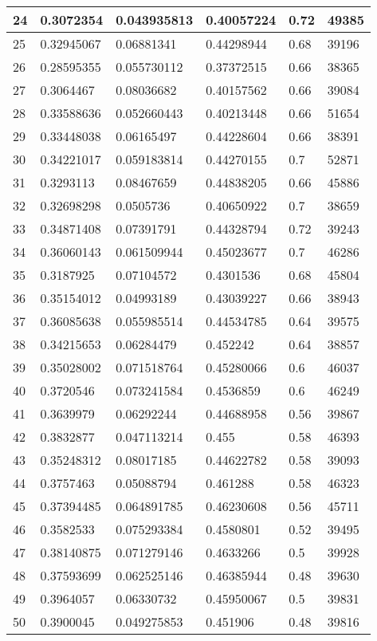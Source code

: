 \begin{longtable}{|l|l|l|l|l|l|}
24 & 0.3072354 & 0.043935813 & 0.40057224 & 0.72 & 49385 \\ \hline 
25 & 0.32945067 & 0.06881341 & 0.44298944 & 0.68 & 39196 \\ \hline 
26 & 0.28595355 & 0.055730112 & 0.37372515 & 0.66 & 38365 \\ \hline 
27 & 0.3064467 & 0.08036682 & 0.40157562 & 0.66 & 39084 \\ \hline 
28 & 0.33588636 & 0.052660443 & 0.40213448 & 0.66 & 51654 \\ \hline 
29 & 0.33448038 & 0.06165497 & 0.44228604 & 0.66 & 38391 \\ \hline 
30 & 0.34221017 & 0.059183814 & 0.44270155 & 0.7 & 52871 \\ \hline 
31 & 0.3293113 & 0.08467659 & 0.44838205 & 0.66 & 45886 \\ \hline 
32 & 0.32698298 & 0.0505736 & 0.40650922 & 0.7 & 38659 \\ \hline 
33 & 0.34871408 & 0.07391791 & 0.44328794 & 0.72 & 39243 \\ \hline 
34 & 0.36060143 & 0.061509944 & 0.45023677 & 0.7 & 46286 \\ \hline 
35 & 0.3187925 & 0.07104572 & 0.4301536 & 0.68 & 45804 \\ \hline 
36 & 0.35154012 & 0.04993189 & 0.43039227 & 0.66 & 38943 \\ \hline 
37 & 0.36085638 & 0.055985514 & 0.44534785 & 0.64 & 39575 \\ \hline 
38 & 0.34215653 & 0.06284479 & 0.452242 & 0.64 & 38857 \\ \hline 
39 & 0.35028002 & 0.071518764 & 0.45280066 & 0.6 & 46037 \\ \hline 
40 & 0.3720546 & 0.073241584 & 0.4536859 & 0.6 & 46249 \\ \hline 
41 & 0.3639979 & 0.06292244 & 0.44688958 & 0.56 & 39867 \\ \hline 
42 & 0.3832877 & 0.047113214 & 0.455 & 0.58 & 46393 \\ \hline 
43 & 0.35248312 & 0.08017185 & 0.44622782 & 0.58 & 39093 \\ \hline 
44 & 0.3757463 & 0.05088794 & 0.461288 & 0.58 & 46323 \\ \hline 
45 & 0.37394485 & 0.064891785 & 0.46230608 & 0.56 & 45711 \\ \hline 
46 & 0.3582533 & 0.075293384 & 0.4580801 & 0.52 & 39495 \\ \hline 
47 & 0.38140875 & 0.071279146 & 0.4633266 & 0.5 & 39928 \\ \hline 
48 & 0.37593699 & 0.062525146 & 0.46385944 & 0.48 & 39630 \\ \hline 
49 & 0.3964057 & 0.06330732 & 0.45950067 & 0.5 & 39831 \\ \hline 
50 & 0.3900045 & 0.049275853 & 0.451906 & 0.48 & 39816 \\ \hline 
\end{longtable}